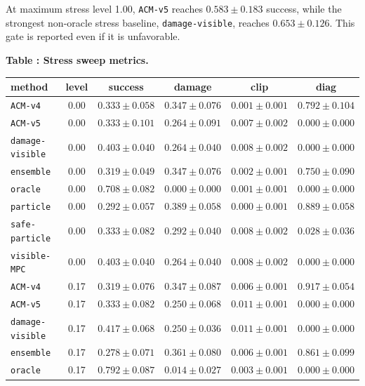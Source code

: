 \documentclass{article}
\begin{document}
At maximum stress level 1.00, \texttt{ACM-v5} reaches $0.583 \pm 0.183$ success, while the strongest non-oracle stress baseline, \texttt{damage-visible}, reaches $0.653 \pm 0.126$. This gate is reported even if it is unfavorable.

\scriptsize
\setlength{\tabcolsep}{2pt}
\begin{center}
\label{tab:stress}\textbf{Table \thetable: Stress sweep metrics.}\\[0.4ex]
\begin{tabular}{lccccc}
\toprule
method & level & success & damage & clip & diag \\
\midrule
\texttt{ACM-v4} & 0.00 & $0.333 \pm 0.058$ & $0.347 \pm 0.076$ & $0.001 \pm 0.001$ & $0.792 \pm 0.104$ \\
\texttt{ACM-v5} & 0.00 & $0.333 \pm 0.101$ & $0.264 \pm 0.091$ & $0.007 \pm 0.002$ & $0.000 \pm 0.000$ \\
\texttt{damage-visible} & 0.00 & $0.403 \pm 0.040$ & $0.264 \pm 0.040$ & $0.008 \pm 0.002$ & $0.000 \pm 0.000$ \\
\texttt{ensemble} & 0.00 & $0.319 \pm 0.049$ & $0.347 \pm 0.076$ & $0.002 \pm 0.001$ & $0.750 \pm 0.090$ \\
\texttt{oracle} & 0.00 & $0.708 \pm 0.082$ & $0.000 \pm 0.000$ & $0.001 \pm 0.001$ & $0.000 \pm 0.000$ \\
\texttt{particle} & 0.00 & $0.292 \pm 0.057$ & $0.389 \pm 0.058$ & $0.000 \pm 0.001$ & $0.889 \pm 0.058$ \\
\texttt{safe-particle} & 0.00 & $0.333 \pm 0.082$ & $0.292 \pm 0.040$ & $0.008 \pm 0.002$ & $0.028 \pm 0.036$ \\
\texttt{visible-MPC} & 0.00 & $0.403 \pm 0.040$ & $0.264 \pm 0.040$ & $0.008 \pm 0.002$ & $0.000 \pm 0.000$ \\
\texttt{ACM-v4} & 0.17 & $0.319 \pm 0.076$ & $0.347 \pm 0.087$ & $0.006 \pm 0.001$ & $0.917 \pm 0.054$ \\
\texttt{ACM-v5} & 0.17 & $0.333 \pm 0.082$ & $0.250 \pm 0.068$ & $0.011 \pm 0.001$ & $0.000 \pm 0.000$ \\
\texttt{damage-visible} & 0.17 & $0.417 \pm 0.068$ & $0.250 \pm 0.036$ & $0.011 \pm 0.001$ & $0.000 \pm 0.000$ \\
\texttt{ensemble} & 0.17 & $0.278 \pm 0.071$ & $0.361 \pm 0.080$ & $0.006 \pm 0.001$ & $0.861 \pm 0.099$ \\
\texttt{oracle} & 0.17 & $0.792 \pm 0.087$ & $0.014 \pm 0.027$ & $0.003 \pm 0.001$ & $0.000 \pm 0.000$ \\

\end{tabular}
\end{center}
\end{document}
